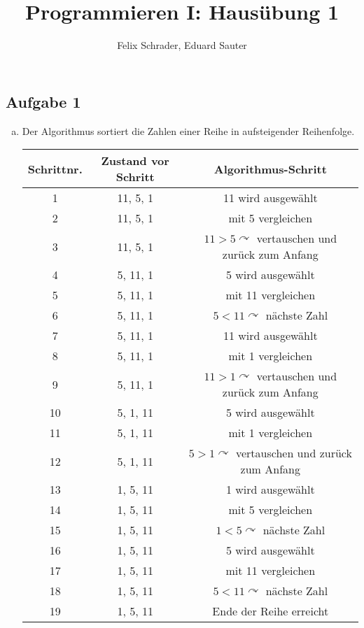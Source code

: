 \documentclass[11pt]{article}
\author{Felix Schrader, Eduard Sauter}
\title{Programmieren I: Haus\"ubung 1}
\begin{document}
\maketitle

\subsection*{Aufgabe 1}
\begin{enumerate}[a)]

\item Der Algorithmus sortiert die Zahlen einer Reihe in aufsteigender Reihenfolge.

\begin{table}[h!]
\centering
\begin{tabular}{|c|c|c|}
\hline 
Schrittnr. & Zustand vor Schritt & Algorithmus-Schritt \\ 
\hline 
1 & 11, 5, 1 & 11 wird ausgew\"ahlt \\ 
\hline 
2 & 11, 5, 1 & mit 5 vergleichen \\ 
\hline 
3 & 11, 5, 1 & $11>5\curvearrowright$ vertauschen und zur\"uck zum Anfang \\ 
\hline 
4 & 5, 11, 1 & 5 wird ausgew\"ahlt \\ 
\hline 
5 & 5, 11, 1 & mit 11 vergleichen \\ 
\hline 
6 & 5, 11, 1 & $5<11\curvearrowright$ n\"achste Zahl \\ 
\hline 
7 & 5, 11, 1 & 11 wird ausgew\"ahlt \\ 
\hline 
8 & 5, 11, 1 & mit 1 vergleichen \\ 
\hline 
9 & 5, 11, 1 & $11>1\curvearrowright$ vertauschen und zur\"uck zum Anfang \\ 
\hline 
10 & 5, 1, 11 & 5 wird ausgew\"ahlt \\ 
\hline 
11 & 5, 1, 11 & mit 1 vergleichen \\ 
\hline 
12 & 5, 1, 11 & $5>1\curvearrowright$ vertauschen und zur\"uck zum Anfang \\ 
\hline 
13 & 1, 5, 11 & 1 wird ausgew\"ahlt \\ 
\hline 
14 & 1, 5, 11 & mit 5 vergleichen \\ 
\hline 
15 & 1, 5, 11 & $1<5\curvearrowright$ n\"achste Zahl \\ 
\hline 
16 & 1, 5, 11 & 5 wird ausgew\"ahlt \\ 
\hline 
17 & 1, 5, 11 & mit 11 vergleichen \\ 
\hline 
18 & 1, 5, 11 & $5<11\curvearrowright$ n\"achste Zahl \\ 
\hline 
19 & 1, 5, 11 & Ende der Reihe erreicht \\ 
\hline 
\end{tabular} 
\end{table}


\end{enumerate}
\end{document}
